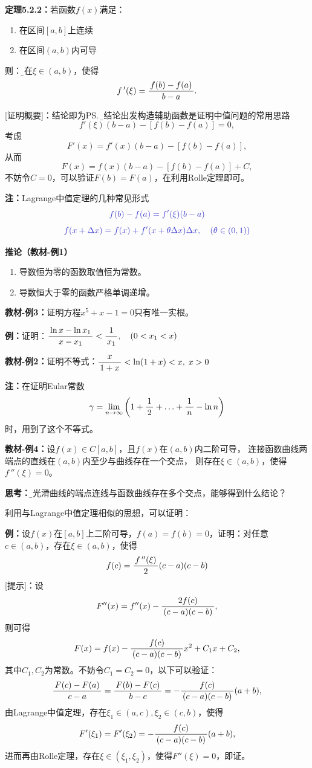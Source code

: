 {\bf 定理5.2.2：}若函数$f(x)$满足： 
\begin{enumerate}[(1)]
  \setlength{\itemindent}{1cm}
  \item 在区间$[a,b]$上连续 
  \item 在区间$(a,b)$内可导 
\end{enumerate}
则：{\b 存在$\xi\in(a,b)$，使得 
$$f\,'(\xi)=\displaystyle\frac{\,{f(b)-f(a)}\,}{\,{b-a}\,}.$$}

[证明概要]：结论即为\ps{\b 从结论出发构造辅助函数是证明中值问题的常用思路}
$$f'(\xi)(b-a)-[f(b)-f(a)]=0,$$
考虑
$$F'(x)=f'(x)(b-a)-[f(b)-f(a)],$$
从而
$$F(x)=f(x)(b-a)-[f(b)-f(a)]+C,$$
不妨令$C=0$，可以验证$F(b)=F(a)$，在利用Rolle定理即可。

{\bf 注：}Lagrange中值定理的几种常见形式
$${\b f(b)-f(a)=f'(\xi)(b-a)}$$
$${\b f(x+\Delta x)=f(x)+f'(x+\theta\Delta x)\Delta x,
\quad (\theta\in(0,1))}$$

{\bf 推论（教材-例1）}
\begin{enumerate}[(1)]
  \setlength{\itemindent}{1cm}
  \item 导数恒为零的函数取值恒为常数。
  \item 导数恒大于零的函数严格单调递增。
\end{enumerate}

{\bf 教材-例3：}证明方程$x^5+x-1=0$只有唯一实根。

{\bf 例：}证明：$\displaystyle\frac{\,{\ln x-\ln x_1}\,}{\,{x-x_1}\,}<\displaystyle\frac{\,{1}\,}{\,{x_1}\,},\quad (0<x_1<x)$

{\bf 教材-例2：}证明不等式：$\displaystyle\frac{\,{x}\,}{\,{1+x}\,}<\ln(1+x)<x,\;x>0$

{\bf 注：}在证明Eular常数
$$\gamma=\lim\limits_{n\to\infty}\left(1+\displaystyle\frac{\,{1}\,}{\,{2}\,}+\ldots+\displaystyle\frac{\,{1}\,}{\,{n}\,}-\ln n\right)$$
时，用到了这个不等式。

{\bf 教材-例4：}设$f(x)\in C[a,b]$，且$f(x)$在$(a,b)$内二阶可导，
连接函数曲线两端点的直线在$(a,b)$内至少与曲线存在一个交点，
则存在$\xi\in(a,b)$，使得$f\,''(\xi)=0$。

{\bf 思考：}{\b 若光滑曲线的端点连线与函数曲线存在多个交点，能够得到什么结论？}

利用与Lagrange中值定理相似的思想，可以证明：

{\bf 例：}设$f(x)$在$[a,b]$上二阶可导，$f(a)=f(b)=0$，证明：对任意
$c\in(a,b)$，存在$\xi\in(a,b)$，使得
$$f(c)=\displaystyle\frac{\,{f\,''(\xi)}\,}{\,{2}\,}(c-a)(c-b)$$
[提示]：设
$$F''(x)=f''(x)-\displaystyle\frac{\,{2f(c)}\,}{\,{(c-a)(c-b)}\,},$$
则可得
$$F(x)=f(x)-\displaystyle\frac{\,{f(c)}\,}{\,{(c-a)(c-b)}\,}x^2+C_1x+C_2,$$
其中$C_1,C_2$为常数。不妨令$C_1=C_2=0$，以下可以验证：
$$\displaystyle\frac{\,{F(c)-F(a)}\,}{\,{c-a}\,}=\displaystyle\frac{\,{F(b)-F(c)}\,}{\,{b-c}\,}
=-\displaystyle\frac{\,{f(c)}\,}{\,{(c-a)(c-b)}\,}(a+b),$$
由Lagrange中值定理，存在$\xi_1\in(a,c),\xi_2\in(c,b)$，使得
$$F'(\xi_1)=F'(\xi_2)=-\displaystyle\frac{\,{f(c)}\,}{\,{(c-a)(c-b)}\,}(a+b),$$
进而再由Rolle定理，存在$\xi\in(\xi_1,\xi_2)$，使得$F''(\xi)=0$，即证。

